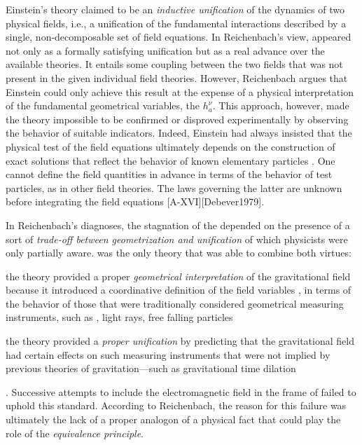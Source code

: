 \documentclass[draft]{article}
\newcommand{\hbein}{\ensuremath{h_{a}^{\nu}}\xspace}
\newcommand{\FP}{\german{Fernparallelismus}\xspace}
\begin{document}
Einstein's theory claimed to be an \emph{inductive unification} of the dynamics of two physical fields, i.e., a unification of the fundamental interactions described by a single, non-decomposable set of field equations. In Reichenbach's view, \FP appeared not only as a formally satisfying unification but as a real advance over the available theories. It entails some coupling between the two fields that was not present in the given individual field theories. However, Reichenbach argues that Einstein could only achieve this result at the expense of a physical interpretation of the fundamental geometrical variables, the \hbein. This approach, however, made the theory impossible to be confirmed or disproved experimentally by observing the behavior of suitable indicators. Indeed, Einstein had always insisted that the physical test of the field equations ultimately depends on the construction of exact solutions that reflect the behavior of known elementary particles \citep[24]{Einstein1930i}. One cannot define the field quantities in advance in terms of the behavior of test particles, as in other field theories. The laws governing the latter are unknown before integrating the field equations [A-XVI][Debever1979].

In Reichenbach's diagnoses, the stagnation of the \uftp depended on the presence of a sort of \emph{trade-off between geometrization and unification} of which physicists were only partially aware. \Gr was the only theory that was able to combine both virtues: \begin{inparaenum}[(a)] \item the theory provided a proper \emph{geometrical interpretation} of the gravitational field because it introduced a coordinative definition of the field variables \gmn, in terms of the behavior of those that were traditionally considered geometrical measuring instruments, such as \rac, light rays, free falling particles \item the theory provided a \emph{proper unification} by predicting that the gravitational field had certain effects on such measuring instruments that were not implied by previous theories of gravitation---such as gravitational time dilation \end{inparaenum} \citep[350\hide{**}]{Reichenbach1928}. Successive attempts to include the electromagnetic field in the frame of \gr failed to uphold this standard. According to Reichenbach, the reason for this failure was ultimately the lack of a proper analogon of a physical fact that could play the role of the \emph{equivalence principle}. 
\end{document}
